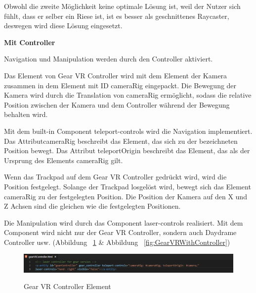   Obwohl die zweite Möglichkeit keine optimale Lösung ist, weil der Nutzer sich fühlt, dass er selber ein Riese ist, ist es besser als geschnittenes Raycaster, deswegen wird diese Lösung eingesetzt. 
  
  \textbf{Mit Controller}
  
  Navigation und Manipulation werden durch den Controller aktiviert.
  
  Das Element von Gear VR Controller wird mit dem Element der Kamera zusammen in dem Element mit ID {\selectfont cameraRig} eingepackt. Die Bewegung der Kamera wird durch die Translation von {\selectfont cameraRig} ermöglicht, sodass die relative Position zwischen der Kamera und dem Controller während der Bewegung behalten wird.
  
  Mit dem built-in Component {\selectfont teleport-controls} wird die Navigation implementiert. Das Attribut{\selectfont cameraRig} beschreibt das Element, das sich zu der bezeichneten Position bewegt. Das Attribut {\selectfont teleportOrigin} beschreibt das Element, das als der Ursprung des Elements {\selectfont cameraRig} gilt.
  
  Wenn das Trackpad auf dem Gear VR Controller gedrückt wird, wird die Position festgelegt. Solange der Trackpad losgelöst wird, bewegt sich das Element {\selectfont cameraRig} zu der festgelegten Position. Die Position der Kamera auf den X und Z Achsen sind die gleichen wie die festgelegten Positionen.
  
  Die Manipulation wird durch das Component {\selectfont laser-controls} realisiert. Mit dem Component wird nicht nur der Gear VR Controller, sondern auch Daydrame Controller usw. (Abbildung ~\ref{fig:GearVRControllerElement} \& Abbildung ~\ref{fig:GearVRWithController})
  
\begin{figure}[ht]
\vspace*{1em}
\centering
\caption[Gear VR Controller Element]{Gear VR Controller Element}
\includegraphics[width=\textwidth]{images/gearVRControllerElement.png}
\label{fig:GearVRControllerElement} 
\end{figure}
  
